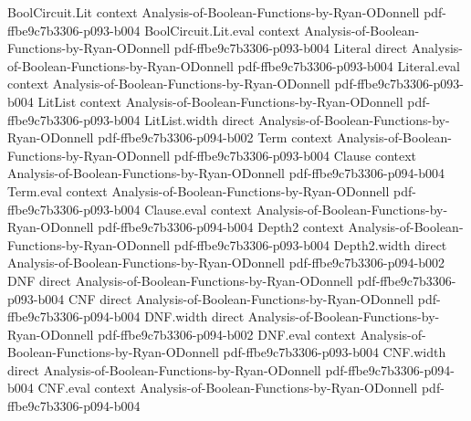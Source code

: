 \begin{lemma}
\label{BoolBLR.BLR_accept_prob_pm1}
\leanok
{}
\proofstep
  {BoolCircuit.Lit}
  {context}
  {Analysis-of-Boolean-Functions-by-Ryan-ODonnell}
  {pdf-ffbe9c7b3306-p093-b004}
\proofstep
  {BoolCircuit.Lit.eval}
  {context}
  {Analysis-of-Boolean-Functions-by-Ryan-ODonnell}
  {pdf-ffbe9c7b3306-p093-b004}
\proofstep
  {Literal}
  {direct}
  {Analysis-of-Boolean-Functions-by-Ryan-ODonnell}
  {pdf-ffbe9c7b3306-p093-b004}
\proofstep
  {Literal.eval}
  {context}
  {Analysis-of-Boolean-Functions-by-Ryan-ODonnell}
  {pdf-ffbe9c7b3306-p093-b004}
\proofstep
  {LitList}
  {context}
  {Analysis-of-Boolean-Functions-by-Ryan-ODonnell}
  {pdf-ffbe9c7b3306-p093-b004}
\proofstep
  {LitList.width}
  {direct}
  {Analysis-of-Boolean-Functions-by-Ryan-ODonnell}
  {pdf-ffbe9c7b3306-p094-b002}
\proofstep
  {Term}
  {context}
  {Analysis-of-Boolean-Functions-by-Ryan-ODonnell}
  {pdf-ffbe9c7b3306-p093-b004}
\proofstep
  {Clause}
  {context}
  {Analysis-of-Boolean-Functions-by-Ryan-ODonnell}
  {pdf-ffbe9c7b3306-p094-b004}
\proofstep
  {Term.eval}
  {context}
  {Analysis-of-Boolean-Functions-by-Ryan-ODonnell}
  {pdf-ffbe9c7b3306-p093-b004}
\proofstep
  {Clause.eval}
  {context}
  {Analysis-of-Boolean-Functions-by-Ryan-ODonnell}
  {pdf-ffbe9c7b3306-p094-b004}
\proofstep
  {Depth2}
  {context}
  {Analysis-of-Boolean-Functions-by-Ryan-ODonnell}
  {pdf-ffbe9c7b3306-p093-b004}
\proofstep
  {Depth2.width}
  {direct}
  {Analysis-of-Boolean-Functions-by-Ryan-ODonnell}
  {pdf-ffbe9c7b3306-p094-b002}
\proofstep
  {DNF}
  {direct}
  {Analysis-of-Boolean-Functions-by-Ryan-ODonnell}
  {pdf-ffbe9c7b3306-p093-b004}
\proofstep
  {CNF}
  {direct}
  {Analysis-of-Boolean-Functions-by-Ryan-ODonnell}
  {pdf-ffbe9c7b3306-p094-b004}
\proofstep
  {DNF.width}
  {direct}
  {Analysis-of-Boolean-Functions-by-Ryan-ODonnell}
  {pdf-ffbe9c7b3306-p094-b002}
\proofstep
  {DNF.eval}
  {context}
  {Analysis-of-Boolean-Functions-by-Ryan-ODonnell}
  {pdf-ffbe9c7b3306-p093-b004}
\proofstep
  {CNF.width}
  {direct}
  {Analysis-of-Boolean-Functions-by-Ryan-ODonnell}
  {pdf-ffbe9c7b3306-p094-b004}
\proofstep
  {CNF.eval}
  {context}
  {Analysis-of-Boolean-Functions-by-Ryan-ODonnell}
  {pdf-ffbe9c7b3306-p094-b004}

\end{lemma}
